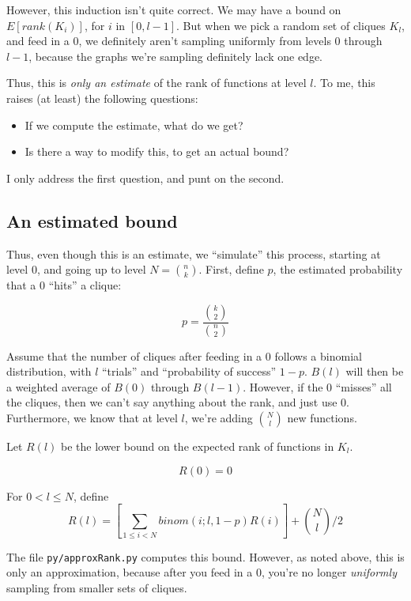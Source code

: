\documentclass[12pt]{article}
\theoremstyle{definition}
\begin{document}
However, this induction isn't quite correct.
We may have a bound on $E[rank(K_i)]$, for $i$ in $[0,l-1]$.
But when we pick a random set of cliques $K_l$, and feed in a 0, we definitely
aren't sampling uniformly from levels 0 through $l-1$, because the graphs we're
sampling definitely lack one edge.

Thus, this is {\em only an estimate} of the rank of functions at level $l$.
To me, this raises (at least) the following questions:

\begin{itemize}

\item If we compute the estimate, what do we get?

\item Is there a way to modify this, to get an actual bound?

\end{itemize}

I only address the first question, and punt on the second.

\subsection{An estimated bound}

Thus, even though this is an estimate, we ``simulate'' this process, starting
at level 0, and going up to level $N = {n \choose k}$. 
First, define $p$, the estimated probability that a 0 ``hits'' a clique:

\[ p = \frac{{k \choose 2}}{{n \choose 2}} \]

Assume that the number of cliques after feeding in a 0 follows a binomial
distribution, with $l$ ``trials'' and ``probability of success'' $1-p$.
$B(l)$ will then be a weighted average of $B(0)$ through $B(l-1)$. However,
if the 0 ``misses'' all the cliques, then we can't say anything about the
rank, and just use 0.
Furthermore, we know that at level $l$, we're adding ${N \choose l}$ new
functions.


Let $R(l)$ be the lower bound on the expected rank of functions in $K_l$.

\[
R(0) = 0
\]

For $0 < l \le N$, define
\[
	R(l) = [ \sum_{1\le i < N} binom(i; l, 1-p) R(i) ] + {N \choose l}/2
\]

The file {\tt py/approxRank.py} computes this bound. However, as noted above, this
is only an approximation, because after you feed in a 0, you're no longer
{\em uniformly} sampling from smaller sets of cliques.
\end{document}
